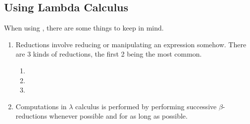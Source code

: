 \subsection{Using Lambda Calculus}\label{subsec:Using_Lambda_Calculus}
When using , there are some things to keep in mind.
\begin{enumerate}[noitemsep]
\item Reductions involve reducing or manipulating an expression somehow.
  There are 3 kinds of reductions, the first 2 being the most common.
  \begin{enumerate}[noitemsep]
  \item {}
  \item {}
  \item {}
  \end{enumerate}
\item Computations in $\lambda$ calculus is performed by performing successive $\beta$-reductions whenever possible and for as long as possible.
\end{enumerate}


